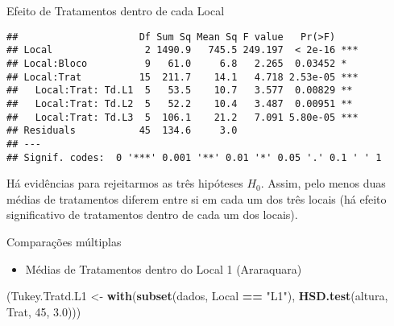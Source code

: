\documentclass[
  ignorenonframetext,
]{beamer}
\newenvironment{Shaded}{\begin{snugshade}}{\end{snugshade}}
\newcommand{\DecValTok}[1]{\textcolor[rgb]{0.00,0.00,0.81}{#1}}
\newcommand{\FloatTok}[1]{\textcolor[rgb]{0.00,0.00,0.81}{#1}}
\newcommand{\FunctionTok}[1]{\textcolor[rgb]{0.13,0.29,0.53}{\textbf{#1}}}
\newcommand{\NormalTok}[1]{#1}
\newcommand{\OtherTok}[1]{\textcolor[rgb]{0.56,0.35,0.01}{#1}}
\newcommand{\SpecialCharTok}[1]{\textcolor[rgb]{0.81,0.36,0.00}{\textbf{#1}}}
\newcommand{\StringTok}[1]{\textcolor[rgb]{0.31,0.60,0.02}{#1}}
\providecommand{\tightlist}{%
  \setlength{\itemsep}{0pt}\setlength{\parskip}{0pt}}
\begin{document}
\begin{frame}[fragile]{Efeito de Tratamentos dentro de cada Local}
\protect\hypertarget{efeito-de-tratamentos-dentro-de-cada-local-3}{}
\begin{verbatim}
##                     Df Sum Sq Mean Sq F value   Pr(>F)    
## Local                2 1490.9   745.5 249.197  < 2e-16 ***
## Local:Bloco          9   61.0     6.8   2.265  0.03452 *  
## Local:Trat          15  211.7    14.1   4.718 2.53e-05 ***
##   Local:Trat: Td.L1  5   53.5    10.7   3.577  0.00829 ** 
##   Local:Trat: Td.L2  5   52.2    10.4   3.487  0.00951 ** 
##   Local:Trat: Td.L3  5  106.1    21.2   7.091 5.80e-05 ***
## Residuals           45  134.6     3.0                     
## ---
## Signif. codes:  0 '***' 0.001 '**' 0.01 '*' 0.05 '.' 0.1 ' ' 1
\end{verbatim}

Há evidências para rejeitarmos as três hipóteses \(H_0\). Assim, pelo
menos duas médias de tratamentos diferem entre si em cada um dos três
locais (há efeito significativo de tratamentos dentro de cada um dos
locais).
\end{frame}

\begin{frame}[fragile]{Comparações múltiplas}
\protect\hypertarget{comparauxe7uxf5es-muxfaltiplas}{}
\begin{itemize}
\tightlist
\item
  Médias de Tratamentos dentro do Local 1 (Araraquara)
\end{itemize}

\begin{Shaded}
\begin{Highlighting}[]
\NormalTok{(Tukey.Tratd.L1 }\OtherTok{\textless{}{-}} \FunctionTok{with}\NormalTok{(}\FunctionTok{subset}\NormalTok{(dados, Local }\SpecialCharTok{==} \StringTok{"L1"}\NormalTok{),}
                        \FunctionTok{HSD.test}\NormalTok{(altura, }
\NormalTok{                                 Trat,}
                                 \DecValTok{45}\NormalTok{,}
                                 \FloatTok{3.0}\NormalTok{)))}
\end{Highlighting}
\end{Shaded}
\end{frame}
\end{document}
